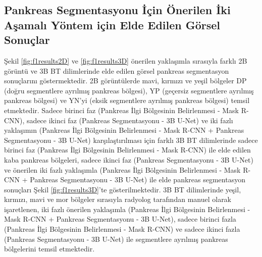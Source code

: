 \subsection{Pankreas Segmentasyonu İçin Önerilen İki Aşamalı Yöntem için Elde Edilen Görsel Sonuçlar}
Şekil \ref{fig:f1results2D} ve \ref{fig:f1results3D} önerilen yaklaşımla sırasıyla farklı 2B görüntü ve 3B BT dilimlerinde elde edilen görsel pankreas segmentasyon sonuçlarını göstermektedir. 2B görüntülerde mavi, kırmızı ve yeşil bölgeler DP (doğru segmentlere ayrılmış pankreas bölgesi), YP (geçersiz segmentlere ayrılmış pankreas bölgesi) ve YN'yi (eksik segmentlere ayrılmış pankreas bölgesi) temsil etmektedir. 
Sadece birinci faz (Pankreas İlgi Bölgesinin Belirlenmesi - Mask R-CNN), sadece ikinci faz (Pankreas Segmentasyonu  - 3B U-Net) ve iki fazlı yaklaşımın (Pankreas İlgi Bölgesinin Belirlenmesi - Mask R-CNN + Pankreas Segmentasyonu  - 3B U-Net) karşılaştırılması için farklı 3B BT dilimlerinde sadece birinci faz (Pankreas İlgi Bölgesinin Belirlenmesi - Mask R-CNN) ile elde edilen kaba pankreas bölgeleri, sadece ikinci faz (Pankreas Segmentasyonu  - 3B U-Net) ve önerilen iki fazlı yaklaşımla (Pankreas İlgi Bölgesinin Belirlenmesi - Mask R-CNN + Pankreas Segmentasyonu  - 3B U-Net) ile elde pankreas segmentasyon sonuçları Şekil \ref{fig:f1results3D}'te gösterilmektedir. 3B BT dilimlerinde yeşil, kırmızı, mavi ve mor bölgeler sırasıyla radyolog tarafından manuel olarak işaretlenen, iki fazlı önerilen yaklaşımla (Pankreas İlgi Bölgesinin Belirlenmesi - Mask R-CNN + Pankreas Segmentasyonu  - 3B U-Net), sadece birinci fazla (Pankreas İlgi Bölgesinin Belirlenmesi - Mask R-CNN) ve sadece ikinci fazla (Pankreas Segmentasyonu  - 3B U-Net) ile segmentlere ayrılmış pankreas bölgelerini temsil etmektedir. 


